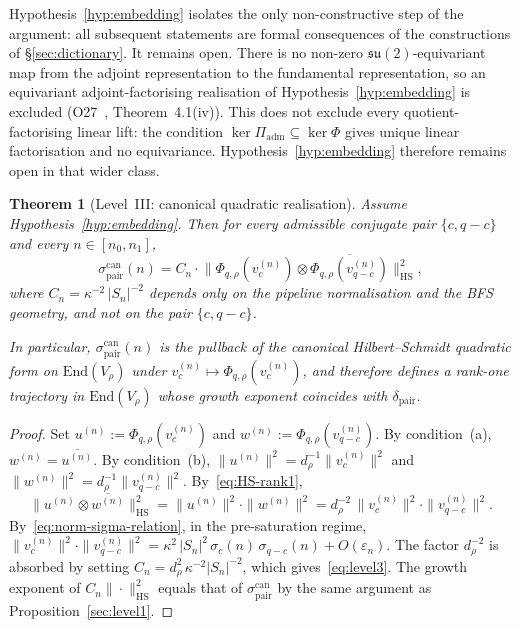 \documentclass[12pt,a4paper]{article}
\newtheorem{theorem}{Theorem}[section]
\theoremstyle{definition}
\theoremstyle{remark}
\begin{document}
    Hypothesis~\ref{hyp:embedding} isolates the only non-constructive step of the
    argument: all subsequent statements are formal consequences of the constructions
    of §\ref{sec:dictionary}.
    It remains open.
    There is no non-zero $\mathfrak{su}(2)$-equivariant map from the adjoint
    representation to the fundamental representation, so an equivariant adjoint-factorising
    realisation of Hypothesis~\ref{hyp:embedding} is excluded (O27~\cite{Beau2026a31},
    Theorem~4.1(iv)).
    This does not exclude every quotient-factorising linear lift: the condition
    $\ker \Pi_{\mathrm{adm}} \subseteq \ker \Phi$ gives unique linear factorisation and no
    equivariance.
    Hypothesis~\ref{hyp:embedding} therefore remains open in that wider class.

    \begin{theorem}[Level~III: canonical quadratic realisation]
      \label{thm:level3}
      Assume Hypothesis~\ref{hyp:embedding}.
      Then for every admissible conjugate pair $\{c, q-c\}$ and every
      $n \in [n_0, n_1]$,
      \begin{equation}
        \sigma^{\mathrm{can}}_{\mathrm{pair}}(n)
        = C_n \cdot
        \bigl\|\Phi_{q,\rho}(v_c^{(n)}) \otimes
        \overline{\Phi_{q,\rho}(v_{q-c}^{(n)})}\bigr\|_{\mathrm{HS}}^2,
        \label{eq:level3}
      \end{equation}
      where $C_n = \kappa^{-2}\,|S_n|^{-2}$ depends only on the pipeline
      normalisation and the BFS geometry, and not on the pair $\{c, q-c\}$.

      In particular, $\sigma^{\mathrm{can}}_{\mathrm{pair}}(n)$ is the pullback of
      the canonical Hilbert--Schmidt quadratic form on $\mathrm{End}(V_\rho)$
      under $v_c^{(n)} \mapsto \Phi_{q,\rho}(v_c^{(n)})$, and therefore defines a
      rank-one trajectory in $\mathrm{End}(V_\rho)$ whose growth exponent coincides
      with $\delta_{\mathrm{pair}}$.
    \end{theorem}

    \begin{proof}
      Set $u^{(n)} := \Phi_{q,\rho}(v_c^{(n)})$ and
      $w^{(n)} := \Phi_{q,\rho}(v_{q-c}^{(n)})$.
      By condition~(a), $w^{(n)} = \overline{u^{(n)}}$.
      By condition~(b), $\|u^{(n)}\|^2 = d_\rho^{-1}\|v_c^{(n)}\|^2$ and
      $\|w^{(n)}\|^2 = d_\rho^{-1}\|v_{q-c}^{(n)}\|^2$.
      By~\eqref{eq:HS-rank1},
      \begin{equation}
        \|u^{(n)} \otimes \overline{w^{(n)}}\|_{\mathrm{HS}}^2
        = \|u^{(n)}\|^2 \cdot \|w^{(n)}\|^2
        = d_\rho^{-2}\,\|v_c^{(n)}\|^2 \cdot \|v_{q-c}^{(n)}\|^2.
      \end{equation}
      By~\eqref{eq:norm-sigma-relation}, in the pre-saturation regime,
      $\|v_c^{(n)}\|^2 \cdot \|v_{q-c}^{(n)}\|^2
      = \kappa^2\,|S_n|^2\,\sigma_c(n)\,\sigma_{q-c}(n) + O(\varepsilon_n)$.
      The factor $d_\rho^{-2}$ is absorbed by setting $C_n = d_\rho^2\,\kappa^{-2}|S_n|^{-2}$,
      which gives~\eqref{eq:level3}.
      The growth exponent of $C_n \|\cdot\|_{\mathrm{HS}}^2$ equals that of
      $\sigma^{\mathrm{can}}_{\mathrm{pair}}$ by the same argument as
      Proposition~\ref{sec:level1}.
    \end{proof}
\end{document}
